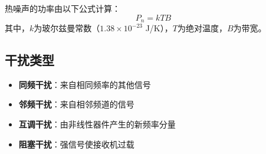 热噪声的功率由以下公式计算：
\[ P_n = kTB \]
其中，$k$为玻尔兹曼常数（$1.38\times10^{-23}$ J/K），$T$为绝对温度，$B$为带宽。

\subsection{干扰类型}

\begin{itemize}
    \item \textbf{同频干扰}：来自相同频率的其他信号
    \item \textbf{邻频干扰}：来自相邻频道的信号
    \item \textbf{互调干扰}：由非线性器件产生的新频率分量
    \item \textbf{阻塞干扰}：强信号使接收机过载
\end{itemize}
